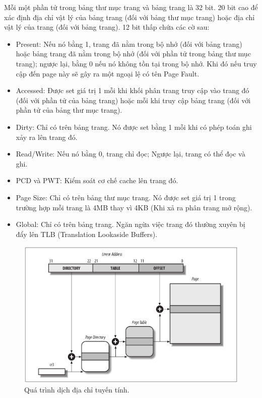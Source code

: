 \documentclass[12pt]{report}
\begin{document}
Mỗi một phần tử trong bảng thư mục trang và bảng trang là 32 bit. 20 bit cao để xác định địa chỉ vật lý của bảng trang (đối với bảng thư mục trang) hoặc địa chỉ vật lý của trang (đối với bảng trang). 12 bit thấp chứa các cờ sau: 
\begin{itemize}
\item Present: Nếu nó bằng 1, trang đã nằm trong bộ nhớ (đối với bảng trang) hoặc bảng trang đã nằm trong bộ nhớ (đối với phần tử trong bảng thư mục trang); ngược lại, bằng 0 nếu nó không tồn tại trong bộ nhớ. Khi đó nếu truy cập đến page này sẽ gây ra một ngoại lệ có tên Page Fault. 
\item Accessed: Được set giá trị 1 mỗi khi khối phân trang truy cập vào trang đó (đối với phần tử của bảng trang) hoặc mỗi khi truy cập bảng trang (đối với phần tử của bảng thư mục trang).
\item Dirty: Chỉ có trên bảng trang. Nó được set bằng 1 mỗi khi có phép toán ghi xảy ra lên trang đó. 
\item Read/Write: Nếu nó bằng 0, trang chỉ đọc; Ngược lại, trang có thể đọc và ghi.
\item PCD và PWT: Kiểm soát cơ chế cache lên trang đó. 
\item Page Size: Chỉ có trên bảng thư mục trang. Nó được set giá trị 1 trong trường hợp mỗi trang là 4MB thay vì 4KB (Khi xả ra phân trang mở rộng).
\item Global: Chỉ có trên bảng trang. Ngăn ngừa việc trang đó thường xuyên bị đẩy lên TLB (Translation Lookaside Buffers).
\end{itemize}

\begin{figure}[h]
\centering
\caption{Quá  trình dịch địa chỉ tuyến tính.}
\includegraphics[width=\textwidth]{paging.png}
\end{figure}


\end{document}
